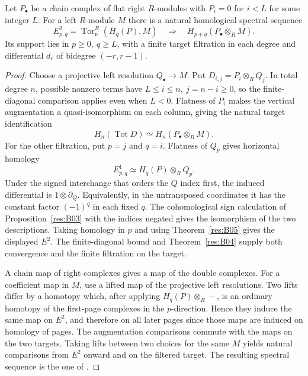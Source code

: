 \begin{theorem}
\label{res:B06}
Let \(P_\bullet\) be a chain complex of flat right \(R\)-modules with
\(P_i=0\) for \(i<L\) for some integer \(L\). For a left \(R\)-module \(M\)
there is a natural homological spectral sequence
\[
    E^2_{p,q}=\operatorname{Tor}^R_p(H_q(P),M)
       \quad\Longrightarrow\quad H_{p+q}(P_\bullet\otimes_R M).
\]
Its support lies in \(p\ge0,\ q\ge L\), with a finite target filtration
in each degree and differential \(d_r\) of bidegree \((-r,r-1)\).
\end{theorem}

\begin{proof}
Choose a projective left resolution \(Q_\bullet\to M\).
Put \(D_{i,j}=P_i\otimes_R Q_j\). In total degree \(n\), possible
nonzero terms have \(L\le i\le n,\ j=n-i\ge0\), so the
finite-diagonal comparison applies even when \(L<0\).
Flatness of \(P_i\) makes the vertical augmentation a
quasi-isomorphism on each column, giving the natural target
identification
\[
     H_n(\operatorname{Tot} D)\simeq H_n(P_\bullet\otimes_R M).
\]
For the other filtration, put \(p=j\) and \(q=i\).
Flatness of \(Q_p\) gives horizontal homology
\[
      E^1_{p,q}\simeq H_q(P)\otimes_R Q_p .
\]
Under the signed interchange that orders the \(Q\) index first, the
induced differential is \(1\otimes\partial_Q\). Equivalently, in the
untransposed coordinates it has the constant factor \((-1)^q\) in
each fixed \(q\). The cohomological sign calculation of
Proposition~\ref{res:B03} with the indices negated gives the isomorphism
of the two descriptions. Taking homology in \(p\) and using
Theorem~\ref{res:B05} gives the displayed \(E^2\). The finite-diagonal
bound and Theorem~\ref{res:B04} supply both convergence and the finite
filtration on the target.

A chain map of right complexes gives a map of the double complexes.
For a coefficient map in \(M\), use a lifted map of the projective
left resolutions. Two lifts differ by a homotopy which, after applying
\(H_q(P)\otimes_R -\), is an ordinary homotopy of the first-page
complexes in the \(p\)-direction. Hence they induce the same map on
\(E^2\), and therefore on all later pages since those maps are induced
on homology of pages. The augmentation comparisons commute with the
maps on the two targets. Taking lifts between two choices for the same
\(M\) yields natural comparisons from \(E^2\) onward and on the
filtered target. The resulting spectral sequence is the one of
\cite[Theorem 5.6.4]{weibel}.
\end{proof}

